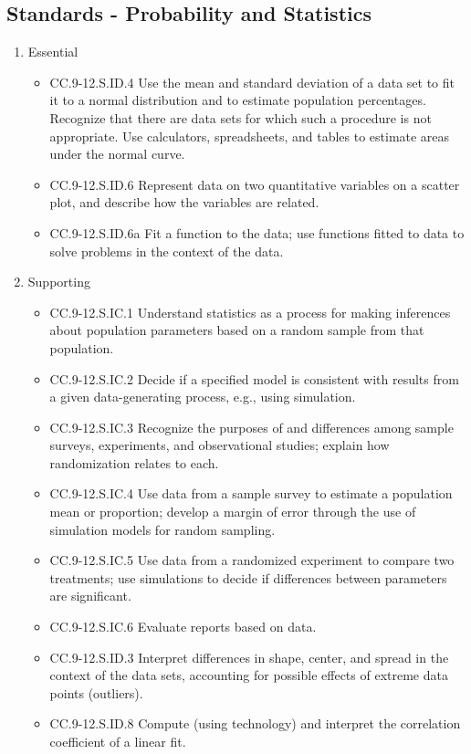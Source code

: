 \documentclass{article}
\begin{document}
\subsection*{Standards - Probability and Statistics}
\begin{enumerate}
	\item Essential
	\begin{itemize}
		\item CC.9-12.S.ID.4  Use the mean and standard deviation of a data set to fit it to a normal distribution and to estimate population percentages. Recognize that there are data sets for which such a procedure is not appropriate. Use calculators, spreadsheets, and tables to estimate areas under the normal curve.
		\item CC.9-12.S.ID.6  Represent data on two quantitative variables on a scatter plot, and describe how the variables are related.
		\item CC.9-12.S.ID.6a Fit a function to the data; use functions fitted to data to solve problems in the context of the data. 
	\end{itemize}		
	\item Supporting
	\begin{itemize}
		\item CC.9-12.S.IC.1  Understand statistics as a process for making inferences about population parameters based on a random sample from that population.
		\item CC.9-12.S.IC.2  Decide if a specified model is consistent with results from a given data-generating process, e.g., using simulation. 
		\item CC.9-12.S.IC.3  Recognize the purposes of and differences among sample surveys, experiments, and observational studies; explain how randomization relates to each.
		\item CC.9-12.S.IC.4  Use data from a sample survey to estimate a population mean or proportion; develop a margin of error through the use of simulation models for random sampling.
		\item CC.9-12.S.IC.5  Use data from a randomized experiment to compare two treatments; use simulations to decide if differences between parameters are significant.
		\item CC.9-12.S.IC.6  Evaluate reports based on data.
		\item CC.9-12.S.ID.3 Interpret differences in shape, center, and spread in the context of the data sets, accounting for possible effects of extreme data points (outliers).
		\item CC.9-12.S.ID.8  Compute (using technology) and interpret the correlation coefficient of a linear fit.

\end{itemize}
\end{enumerate}
\end{document}

